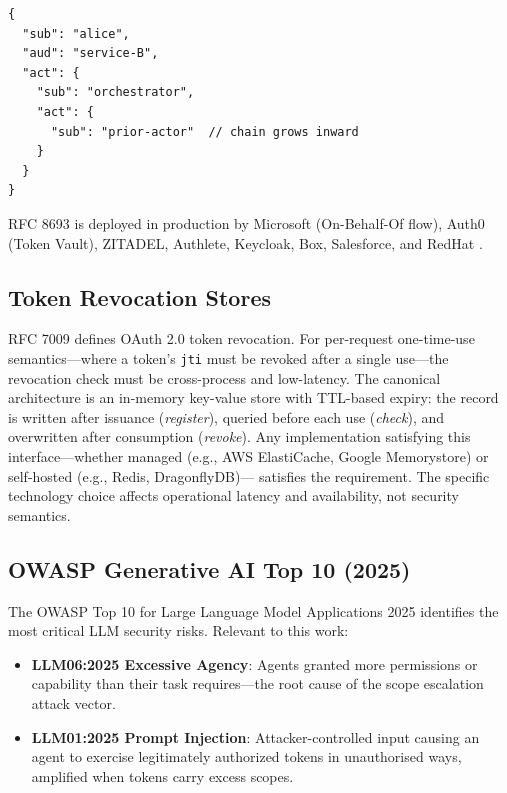 \documentclass[journal]{IEEEtran}
\begin{document}
\begin{lstlisting}[language={},caption={Nested act claim per RFC 8693 \S 4.1},
                   label={lst:actchain}]
{
  "sub": "alice",
  "aud": "service-B",
  "act": {
    "sub": "orchestrator",
    "act": {
      "sub": "prior-actor"  // chain grows inward
    }
  }
}
\end{lstlisting}

RFC 8693 is deployed in production by Microsoft (On-Behalf-Of flow), Auth0
(Token Vault), ZITADEL, Authlete, Keycloak, Box, Salesforce, and
RedHat \cite{rfc8693_deploy}.

\subsection{Token Revocation Stores}

RFC 7009 \cite{rfc7009} defines OAuth 2.0 token revocation. For per-request
one-time-use semantics---where a token's \texttt{jti} must be revoked after a
single use---the revocation check must be cross-process and low-latency. The
canonical architecture is an in-memory key-value store with TTL-based expiry:
the record is written after issuance (\textit{register}), queried before each
use (\textit{check}), and overwritten after consumption (\textit{revoke}). Any
implementation satisfying this interface---whether managed (e.g., AWS
ElastiCache, Google Memorystore) or self-hosted (e.g., Redis, DragonflyDB)---
satisfies the requirement. The specific technology choice affects operational
latency and availability, not security semantics.

\subsection{OWASP Generative AI Top 10 (2025)}

The OWASP Top 10 for Large Language Model Applications 2025 \cite{owasp_genai}
identifies the most critical LLM security risks. Relevant to this work:
\begin{itemize}
  \item \textbf{LLM06:2025 Excessive Agency}: Agents granted more permissions
        or capability than their task requires---the root cause of the scope
        escalation attack vector.
  \item \textbf{LLM01:2025 Prompt Injection}: Attacker-controlled input causing
        an agent to exercise legitimately authorized tokens in unauthorised ways,
        amplified when tokens carry excess scopes.
\end{itemize}
\end{document}
